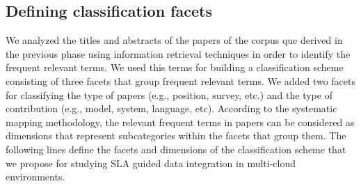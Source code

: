 
\subsection{Defining classification facets}

We analyzed the titles and abstracts of the papers of the corpus que derived in the previous phase using information retrieval techniques in order to identify the frequent relevant terms. We used this terms for building a classification scheme consisting of three facets that group frequent relevant terms. We added two facets for classifying the type of papers (e.g., position, survey, etc.) and the type of contribution (e.g., model, system, language, etc). According to the systematic mapping methodology, the relevant frequent terms in papers can be considered as dimensions that represent subcategories within the facets that group them. The following lines define the facets and dimensions of the classification scheme that we propose for studying SLA guided data integration in multi-cloud environments.

